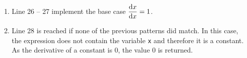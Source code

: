 \begin{enumerate}
      language provides:
      \\[0.2cm]
      \hspace*{1.3cm}
      $\ds\frac{\mathrm{d}\;}{\mathrm{d}x}\ln\bigl(f(x)\bigr) 
       = \frac{\frac{\mathrm{d}}{\mathrm{d}x} f(x)}{f(x)}$
      \qquad and \qquad
      $\ds\frac{\mathrm{d}\;}{\mathrm{d}x}\exp\bigl(f(x)\bigr)
       = \Bigl(\frac{\mathrm{d}\;}{\mathrm{d}x} f(x)\Bigr) \cdot \exp\bigl(f(x)\bigr)$.
      \\[0.2cm]
      Observe that line 25 reuses the expression \texttt{e} instead of building the tree
      \texttt{('exp', f)} a second time.
\item Line 26 -- 27 implement the base case
      $\displaystyle\frac{\mathrm{d}x}{\mathrm{d}x} = 1$.
\item Line 28 is reached if none of the previous patterns did match.  In this case, the expression does
      not contain the variable \texttt{x} and therefore it is a constant.  As the derivative of a constant
      is $0$, the value $0$ is returned.
\end{enumerate}
\FloatBarrier

